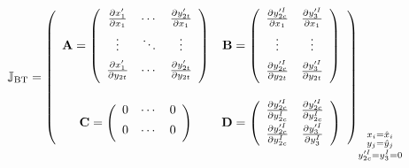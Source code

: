 \documentclass[11pt]{article}
\begin{document}
\begin{equation}
	\mathbb{J}_{\text{BT}} = \left( \begin{array}{cc}
		\mathbf{A} = \left( \begin{array}{ccc} 
										\frac{\partial x'_1}{\partial x_1} & \cdots & \frac{\partial y'_{2t}}{\partial x_1} \\[1ex]
										\vdots & \ddots & \vdots \\[1ex]
										\frac{\partial x'_1}{\partial y_{2t}} & \cdots & \frac{\partial y'_{2t}}{\partial y_{2t}} \\[1ex]
									\end{array} \right) &
				\mathbf{B} = \left( \begin{array}{cc} 
										\frac{\partial y'^I_{2c}}{\partial x_1} & \frac{\partial y'^I_{3}}{\partial x_1} \\[1ex]
										\vdots & \vdots \\[1ex]
										\frac{\partial y'^I_{2c}}{\partial y_{2t}} & \frac{\partial y'^I_{3}}{\partial y_{2t}} \\[1ex]
									\end{array} \right) \\
		\!\rule{0pt}{0pt} \\
		\mathbf{C} = \left( \begin{array}{ccc} 
								0 & \cdots & 0\\[1ex]
								0 & \cdots & 0\\[1ex]
							\end{array} \right) &
		\mathbf{D} = \left( \begin{array}{cc} 
								\frac{\partial y'^I_{2c}}{\partial y^I_{2c}} & \frac{\partial y'^I_{2c}}{\partial y^I_{2c}} \\[1ex]
								\frac{\partial y'^I_{2c}}{\partial y^I_{2c}} & \frac{\partial y'^I_{3}}{\partial y^I_{3}} \\[1ex]
							\end{array} \right) \\[1ex]
				 \end{array} \right)_{\substack{
										x_i = \hat{x}_i \\
										y_j = \hat{y}_j \\
										y'^I_{2c} = y^I_{3} = 0}} \\[1ex]
\end{equation}
\end{document}
